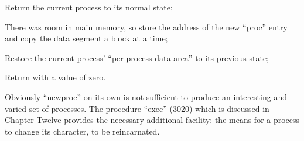 \item[1908:] Return the current process to its
 normal state;

\item[1913:] There was room in main memory, so
 store the address of the new
 ``proc'' entry and copy the data
 segment a block at a time;

\item[1917:] Restore the current process'
 ``per process data area'' to its
 previous state;

\item[1918:] Return with a value of zero.
\ed


Obviously ``newproc'' on its own is not
sufficient to produce an interesting
and varied set of processes. The procedure ``exec'' (3020) which is discussed
in Chapter Twelve provides the necessary additional facility: the means for
a process to change its character, to
be reincarnated.
